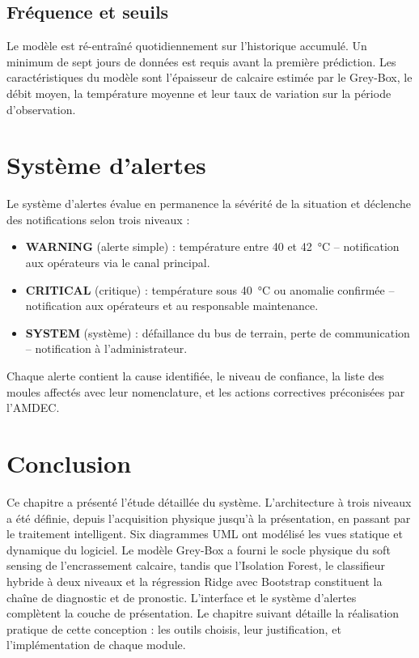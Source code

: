 \subsection{Fréquence et seuils}

Le modèle est ré-entraîné quotidiennement sur l'historique accumulé. Un minimum de sept jours de données est requis avant la première prédiction. Les caractéristiques du modèle sont l'épaisseur de calcaire estimée par le Grey-Box, le débit moyen, la température moyenne et leur taux de variation sur la période d'observation.

\section{Système d'alertes}

Le système d'alertes évalue en permanence la sévérité de la situation et déclenche des notifications selon trois niveaux :

\begin{itemize}
  \item \textbf{WARNING} (alerte simple) : température entre 40 et 42~\si{\celsius} -- notification aux opérateurs via le canal principal.
  \item \textbf{CRITICAL} (critique) : température sous 40~\si{\celsius} ou anomalie confirmée -- notification aux opérateurs et au responsable maintenance.
  \item \textbf{SYSTEM} (système) : défaillance du bus de terrain, perte de communication -- notification à l'administrateur.
\end{itemize}

Chaque alerte contient la cause identifiée, le niveau de confiance, la liste des moules affectés avec leur nomenclature, et les actions correctives préconisées par l'AMDEC.

\section*{Conclusion}

Ce chapitre a présenté l'étude détaillée du système. L'architecture à trois niveaux a été définie, depuis l'acquisition physique jusqu'à la présentation, en passant par le traitement intelligent. Six diagrammes UML ont modélisé les vues statique et dynamique du logiciel. Le modèle Grey-Box a fourni le socle physique du soft sensing de l'encrassement calcaire, tandis que l'Isolation Forest, le classifieur hybride à deux niveaux et la régression Ridge avec Bootstrap constituent la chaîne de diagnostic et de pronostic. L'interface et le système d'alertes complètent la couche de présentation. Le chapitre suivant détaille la réalisation pratique de cette conception : les outils choisis, leur justification, et l'implémentation de chaque module.
